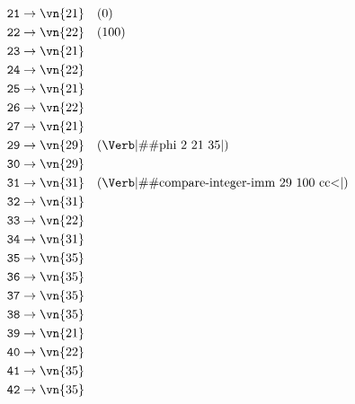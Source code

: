 \begin{align*}
  \texttt{21} &\to \vn{21} \quad (0)                                                \\
  \texttt{22} &\to \vn{22} \quad (100)                                              \\
  \texttt{23} &\to \vn{21}                                                          \\
  \texttt{24} &\to \vn{22}                                                          \\
  \texttt{25} &\to \vn{21}                                                          \\
  \texttt{26} &\to \vn{22}                                                          \\
  \texttt{27} &\to \vn{21}                                                          \\
  \texttt{29} &\to \vn{29} \quad (\text{\Verb|\#\#phi 2 21 35|})                    \\
  \texttt{30} &\to \vn{29}                                                          \\
  \texttt{31} &\to \vn{31} \quad (\text{\Verb|\#\#compare-integer-imm 29 100 cc<|}) \\
  \texttt{32} &\to \vn{31}                                                          \\
  \texttt{33} &\to \vn{22}                                                          \\
  \texttt{34} &\to \vn{31}                                                          \\
  \texttt{35} &\to \vn{35}                                                          \\
  \texttt{36} &\to \vn{35}                                                          \\
  \texttt{37} &\to \vn{35}                                                          \\
  \texttt{38} &\to \vn{35}                                                          \\
  \texttt{39} &\to \vn{21}                                                          \\
  \texttt{40} &\to \vn{22}                                                          \\
  \texttt{41} &\to \vn{35}                                                          \\
  \texttt{42} &\to \vn{35}
\end{align*}

